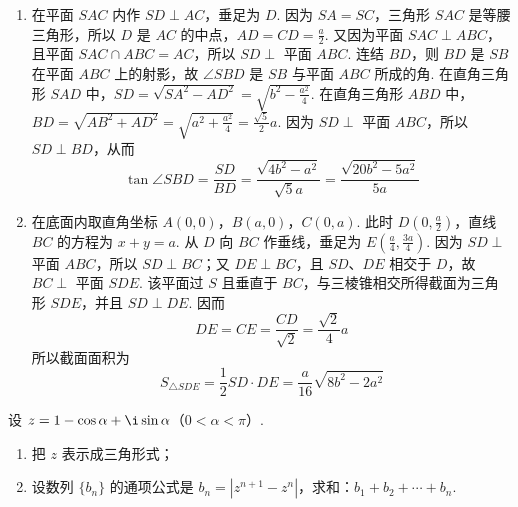 \documentclass[UTF8,a4paper,oneside,11pt]{ctexbook}
\begin{document}
\begin{solution}
\begin{enumerate}
\item 在平面 \(SAC\) 内作 \(SD\perp AC\)，垂足为 \(D\). 因为 \(SA=SC\)，三角形 \(SAC\) 是等腰三角形，所以 \(D\) 是 \(AC\) 的中点，\(AD=CD=\frac{a}{2}\). 又因为平面 \(SAC\perp ABC\)，且平面 \(SAC\cap ABC=AC\)，所以 \(SD\perp\) 平面 \(ABC\). 连结 \(BD\)，则 \(BD\) 是 \(SB\) 在平面 \(ABC\) 上的射影，故 \(\angle SBD\) 是 \(SB\) 与平面 \(ABC\) 所成的角. 在直角三角形 \(SAD\) 中，\(SD=\sqrt{SA^2-AD^2}=\sqrt{b^2-\frac{a^2}{4}}\). 在直角三角形 \(ABD\) 中，\(BD=\sqrt{AB^2+AD^2}=\sqrt{a^2+\frac{a^2}{4}}=\frac{\sqrt{5}}{2}a\). 因为 \(SD\perp\) 平面 \(ABC\)，所以 \(SD\perp BD\)，从而
\[
\tan\angle SBD=\frac{SD}{BD}=\frac{\sqrt{4b^2-a^2}}{\sqrt{5}a}=\frac{\sqrt{20b^2-5a^2}}{5a}
\]

\item 在底面内取直角坐标 \(A(0,0)\)，\(B(a,0)\)，\(C(0,a)\). 此时 \(D\left(0,\frac{a}{2}\right)\)，直线 \(BC\) 的方程为 \(x+y=a\). 从 \(D\) 向 \(BC\) 作垂线，垂足为 \(E\left(\frac{a}{4},\frac{3a}{4}\right)\). 因为 \(SD\perp\) 平面 \(ABC\)，所以 \(SD\perp BC\)；又 \(DE\perp BC\)，且 \(SD\)、\(DE\) 相交于 \(D\)，故 \(BC\perp\) 平面 \(SDE\). 该平面过 \(S\) 且垂直于 \(BC\)，与三棱锥相交所得截面为三角形 \(SDE\)，并且 \(SD\perp DE\). 因而
\[
DE=CE=\frac{CD}{\sqrt{2}}=\frac{\sqrt{2}}{4}a
\]
所以截面面积为
\[
S_{\triangle SDE}=\frac{1}{2}SD\cdot DE=\frac{a}{16}\sqrt{8b^2-2a^2}
\]
\end{enumerate}

\end{solution}


\begin{problem}

设 \(z = 1 - \cos \alpha + \i\sin \alpha\)（\(0 < \alpha < \pi\)）.

\begin{enumerate}
\item 把 \(z\) 表示成三角形式；
\item 设数列 \(\{b_n\}\) 的通项公式是 \(b_n = |z^{n+1} - z^n|\)，求和：\(b_1 + b_2 + \cdots + b_n\).
\end{enumerate}
\end{problem}
\end{document}
